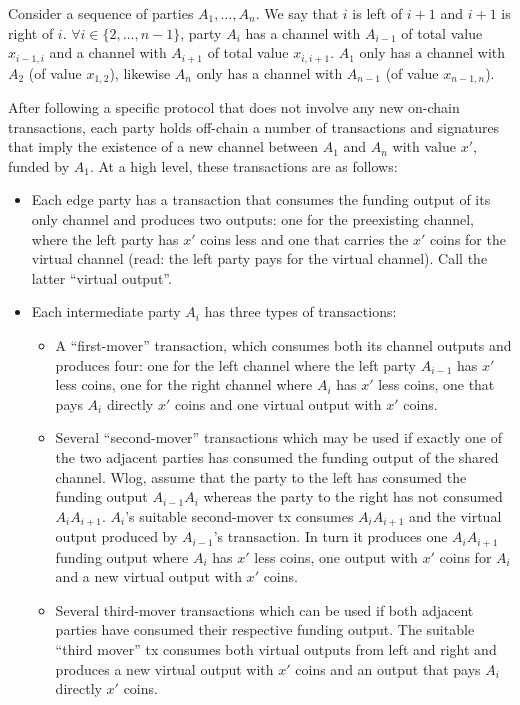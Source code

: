 Consider a sequence of parties $A_1, \dots, A_n$. We say that $i$ is left of
$i+1$ and $i+1$ is right of $i$. $\forall i \in \{2, \dots, n-1\}$, party $A_i$
has a channel with $A_{i-1}$ of total value $x_{i-1, i}$ and a channel with
$A_{i+1}$ of total value $x_{i, i+1}$. $A_1$ only has a channel with $A_2$ (of
value $x_{1, 2}$), likewise $A_n$ only has a channel with $A_{n-1}$ (of value
$x_{n-1, n}$).

After following a specific protocol that does not involve any new on-chain
transactions, each party holds off-chain a number of transactions and signatures
that imply the existence of a new channel between $A_1$ and $A_n$ with value
$x'$, funded by $A_1$. At a high level, these transactions are as follows:
\begin{itemize}
  \item Each edge party has a transaction that consumes the funding output of
  its only channel and produces two outputs: one for the preexisting channel,
  where the left party has $x'$ coins less and one that carries the $x'$ coins
  for the virtual channel (read: the left party pays for the virtual channel).
  Call the latter ``virtual output''.
  \item Each intermediate party $A_i$ has three types of transactions:
  \begin{itemize}
    \item A ``first-mover'' transaction, which consumes both its channel outputs
    and produces four: one for the left channel where the left party $A_{i-1}$
    has $x'$ less coins, one for the right channel where $A_i$ has $x'$ less
    coins, one that pays $A_i$ directly $x'$ coins and one virtual output with
    $x'$ coins.
    \item Several ``second-mover'' transactions which may be used if exactly one
    of the two adjacent parties has consumed the funding output of the shared
    channel. Wlog, assume that the party to the left has consumed the funding
    output $A_{i-1} A_i$ whereas the party to the right has not consumed $A_i
    A_{i+1}$. $A_i$'s suitable second-mover tx consumes $A_i A_{i+1}$ and
    the virtual output produced by $A_{i-1}$'s transaction. In turn it produces
    one $A_i A_{i+1}$ funding output where $A_i$ has $x'$ less coins, one output
    with $x'$ coins for $A_i$ and a new virtual output with $x'$ coins.
    \item Several third-mover transactions which can be used if both
    adjacent parties have consumed their respective funding output. The suitable
    ``third mover'' tx consumes both virtual outputs from left and right and
    produces a new virtual output with $x'$ coins and an output that pays $A_i$
    directly $x'$ coins.
  \end{itemize}


\end{itemize}
